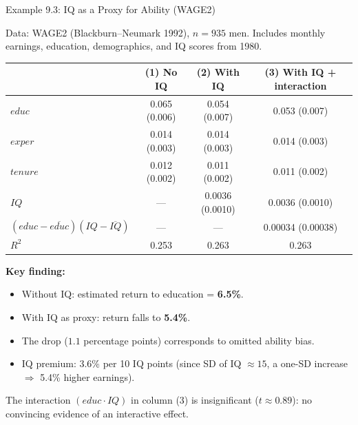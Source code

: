 \documentclass[aspectratio=169, 12pt]{beamer}
\begin{document}
\begin{frame}[shrink=15]{Example 9.3: IQ as a Proxy for Ability (WAGE2)}

  Data: WAGE2 (Blackburn--Neumark 1992), $n = 935$ men. Includes monthly earnings,
  education, demographics, and IQ scores from 1980.

  \begin{center}\footnotesize
  \begin{tabular}{l|ccc}
  \hline
  & (1) No IQ & (2) With IQ & (3) With IQ + interaction \\
  \hline
  $\mathit{educ}$ & 0.065 (0.006) & 0.054 (0.007) & 0.053 (0.007) \\
  $\mathit{exper}$ & 0.014 (0.003) & 0.014 (0.003) & 0.014 (0.003) \\
  $\mathit{tenure}$ & 0.012 (0.002) & 0.011 (0.002) & 0.011 (0.002) \\
  $\mathit{IQ}$ & --- & 0.0036 (0.0010) & 0.0036 (0.0010) \\
  $(educ - \overline{educ})(IQ - \overline{IQ})$ & --- & --- & 0.00034 (0.00038) \\
  \hline
  $R^2$ & 0.253 & 0.263 & 0.263 \\
  \hline
  \end{tabular}
  \end{center}

  \textbf{Key finding:}
  \begin{itemize}\setlength{\itemsep}{1pt}
    \item Without IQ: estimated return to education = \textbf{6.5\%}.
    \item With IQ as proxy: return falls to \textbf{5.4\%}.
    \item The drop ($1.1$ percentage points) corresponds to omitted ability bias.
    \item IQ premium: 3.6\% per 10 IQ points (since SD of IQ $\approx 15$, a one-SD
    increase $\Rightarrow$ 5.4\% higher earnings).
  \end{itemize}

  \begin{keybox}
    The interaction $(educ \cdot IQ)$ in column (3) is insignificant ($t \approx 0.89$):
    no convincing evidence of an interactive effect.
  \end{keybox}

\end{frame}
\end{document}
